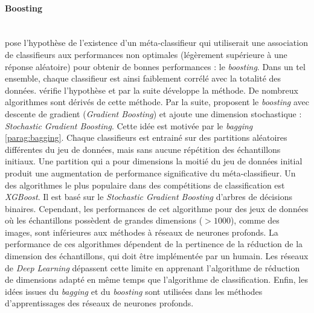 \paragraph{Boosting}\mbox{\label{parag:boosting}} \\
\citeauthor{kearns_thoughts_1988} \cite{kearns_thoughts_1988} pose l'hypothèse de l'existence d'un méta-classifieur qui utiliserait une association de classifieurs aux performances non optimales (légèrement supérieure à une réponse aléatoire) pour obtenir de bonnes performances : le \textit{boosting}.
Dans un tel ensemble, chaque classifieur est ainsi faiblement corrélé avec la totalité des données.
\citeauthor{schapire_strength_1990} \cite{schapire_strength_1990} vérifie l'hypothèse et par la suite \citeauthor{breiman_bias_1996} \cite{breiman_bias_1996, breiman_arcing_1997} développe la méthode.
De nombreux algorithmes sont dérivés de cette méthode.
Par la suite, \citeauthor{mason_boosting_1999, friedman_greedy_2001} \cite{mason_boosting_1999, friedman_greedy_2001} proposent le \textit{boosting} avec descente de gradient (\textit{Gradient Boosting}) et \citeauthor{friedman_stochastic_2002} \cite{friedman_stochastic_2002} ajoute une dimension stochastique : \textit{Stochastic Gradient Boosting}.
Cette idée est motivée par le \textit{bagging} \ref{parag:bagging}.
Chaque classifieurs est entrainé sur des partitions aléatoires différentes du jeu de données, mais sans aucune répétition des échantillons initiaux.
Une partition qui a pour dimensions la moitié du jeu de données initial produit une augmentation de performance significative du méta-classifieur.
Un des algorithmes le plus populaire dans des compétitions de classification est \textit{XGBoost}.
Il est basé sur le \textit{Stochastic Gradient Boosting} d'arbres de décisions binaires.
Cependant, les performances de cet algorithme pour des jeux de données où les échantillons possèdent de grandes dimensions ($> 1000$), comme des images, sont inférieures aux méthodes à réseaux de neurones profonds.
La performance de ces algorithmes dépendent de la pertinence de la réduction de la dimension des échantillons, qui doit être implémentée par un humain.
Les réseaux de \textit{Deep Learning} dépassent cette limite en apprenant l'algorithme de réduction de dimensions adapté en même temps que l'algorithme de classification.
Enfin, les idées issues du \textit{bagging} et du \textit{boosting} sont utilisées dans les méthodes d'apprentissages des réseaux de neurones profonds.

